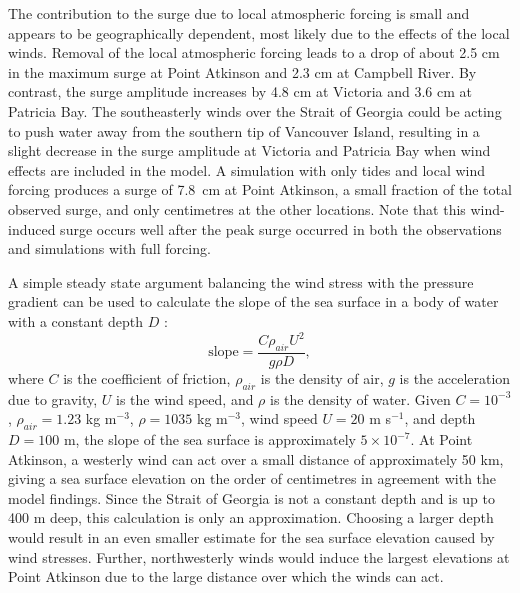\documentclass[letterpaper]{tATO2e}
\begin{document}
The contribution to the surge due to local atmospheric forcing is small and appears to be geographically dependent, most likely due to the effects of the local winds. Removal of the local atmospheric forcing leads to a drop of about 2.5 cm in the maximum surge at Point Atkinson and 2.3 cm at Campbell River. By contrast, the surge amplitude increases by 4.8 cm at Victoria and 3.6 cm at Patricia Bay. The southeasterly winds over the Strait of Georgia could be acting to push water away from the southern tip of Vancouver Island, resulting in a slight decrease in the surge amplitude at Victoria and Patricia Bay when wind effects are included in the model. A simulation with only tides and local wind forcing produces a surge of 7.8~cm at Point Atkinson, a small fraction of the total observed surge, and only centimetres at the other locations.  Note that this wind-induced surge occurs well after the peak surge occurred in both the observations and simulations with full forcing.

A simple steady state argument balancing the wind stress with the pressure gradient can be used to calculate the slope of the sea surface in a body of water with a constant depth $D$ \citep{pugh2004changing}: 
\begin{equation}
\text{slope} = \frac{C\rho_{air}U^2}{g\rho D},
\end{equation}
where $C$ is the coefficient of friction, $\rho_{air}$ is the density of air, $g$ is the acceleration due to gravity, $U$ is the wind speed, and $\rho$ is the density of water. Given  $C=10^{-3}$, $\rho_{air}=1.23$ kg m$^{-3}$, $\rho= 1035$  kg m$^{-3}$, wind speed $U=20$ m s$^{-1}$, and depth $D=100$ m, the slope of the sea surface is approximately $5\times10^{-7}$. At Point Atkinson, a westerly wind can act over a small distance of approximately 50 km, giving a sea surface elevation on the order of centimetres in agreement with the model findings. Since the Strait of Georgia is not a constant depth and is up to 400 m deep, this calculation is only an approximation. Choosing a larger depth would result in an even smaller estimate for the sea surface elevation caused by wind stresses. Further, northwesterly winds would induce the largest elevations at Point Atkinson due to the large distance over which the winds can act. 
\end{document}
